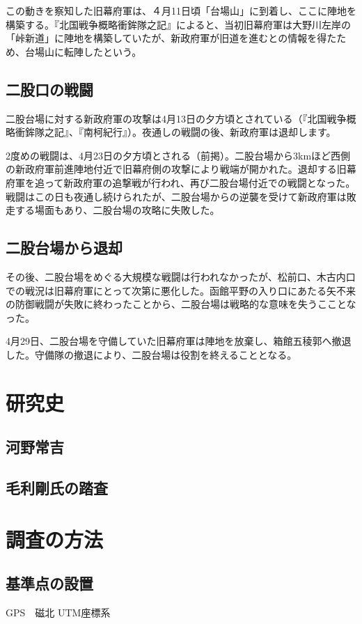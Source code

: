 \documentclass[14Q]{jsarticle}
\begin{document}
この動きを察知した旧幕府軍は、４月11日頃「台場山」に到着し、ここに陣地を構築する。『北国戦争概略衝鉾隊之記』によると、当初旧幕府軍は大野川左岸の「峠新道」に陣地を構築していたが、新政府軍が旧道を進むとの情報を得たため、台場山に転陣したという。

\subsection{二股口の戦闘}
二股台場に対する新政府軍の攻撃は4月13日の夕方頃とされている（『北国戦争概略衝鉾隊之記』、『南柯紀行』）。夜通しの戦闘の後、新政府軍は退却します。

2度めの戦闘は、4月23日の夕方頃とされる（前掲）。二股台場から3kmほど西側の新政府軍前進陣地付近で旧幕府側の攻撃により戦端が開かれた。退却する旧幕府軍を追って新政府軍の追撃戦が行われ、再び二股台場付近での戦闘となった。戦闘はこの日も夜通し続けられたが、二股台場からの逆襲を受けて新政府軍は敗走する場面もあり、二股台場の攻略に失敗した。

\subsection{二股台場から退却}
その後、二股台場をめぐる大規模な戦闘は行われなかったが、松前口、木古内口での戦況は旧幕府軍にとって次第に悪化した。函館平野の入り口にあたる矢不来の防御戦闘が失敗に終わったことから、二股台場は戦略的な意味を失うこことなった。

4月29日、二股台場を守備していた旧幕府軍は陣地を放棄し、箱館五稜郭へ撤退した。守備隊の撤退により、二股台場は役割を終えることとなる。

\section{研究史}
\subsection{河野常吉}

\subsection{毛利剛氏の踏査}

\section{調査の方法}
\subsection{基準点の設置}
GPS　磁北
UTM座標系
\end{document}
